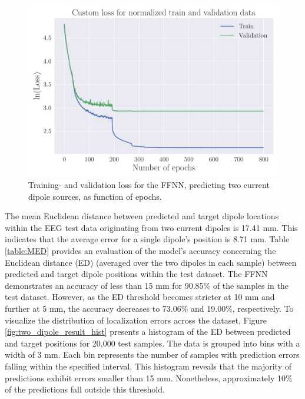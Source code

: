 \documentclass[a4paper, UKenglish, 11pt]{uiomaster}
\begin{document}
\begin{figure}[!htb]
    \centering
    \includegraphics[width=\linewidth]{figures/NN_two_dipole/Custom_Loss_simple_last_run_old_std_2_dipoles_32_0.001_0.35_0.1_0_800_(0).pdf}
    \caption{Training- and validation loss for the FFNN, predicting two current dipole sources, as function of epochs.}
    \label{fig:two_dipole_result_FFNN}
\end{figure}

\FloatBarrier

The mean Euclidean distance between predicted and target dipole locations within the EEG test data originating from two current dipoles is 17.41 mm. This indicates that the average error for a single dipole's position is 8.71 mm. Table \ref{table:MED} provides an evaluation of the model's accuracy concerning the Euclidean distance (ED) (averaged over the two dipoles in each sample) between predicted and target dipole positions within the test dataset. The FFNN demonstrates an accuracy of less than 15 mm for 90.85$\%$ of the samples in the test dataset. However, as the ED threshold becomes stricter at 10 mm and further at 5 mm, the accuracy decreases to 73.06$\%$ and 19.00$\%$, respectively. To visualize the distribution of localization errors across the dataset, Figure \ref{fig:two_dipole_result_hist} presents a histogram of the ED between predicted and target positions for 20,000 test samples. The data is grouped into bins with a width of 3 mm. Each bin represents the number of samples with prediction errors falling within the specified interval. This histogram reveals that the majority of predictions exhibit errors smaller than 15 mm. Nonetheless, approximately 10$\%$ of the predictions fall outside this threshold.
\end{document}
